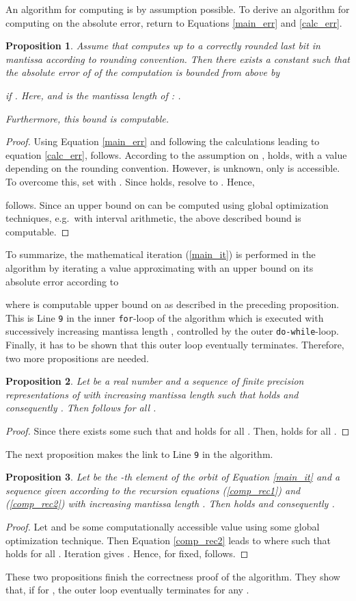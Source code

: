 \documentclass[copyright,creativecommons]{eptcs}
\newtheorem{proposition}{Proposition}[section]
\theoremstyle{definition}
\begin{document}
An algorithm for computing  is by assumption possible.
To derive an algorithm for computing  on the absolute
error, return to Equations \ref{main_err} and \ref{calc_err}.
\begin{proposition}
\label{prop:ubound}
Assume that  computes  up to
a correctly rounded last bit in mantissa according to rounding convention.
Then there exists a constant  such that the absolute error of
 of the computation  is bounded from above by

if . Here,
 and  is the mantissa length of : .

Furthermore, this bound is computable.
\end{proposition}
\begin{proof}
Using Equation \ref{main_err} and following the calculations leading to
equation \ref{calc_err},
 follows. According to the assumption
on ,
 holds, with
a value  depending on the rounding convention. However,
 is unknown, only  is accessible.
To overcome this, set 
with . Since  holds, resolve to
. Hence,

follows. Since an upper bound on  can be
computed using global optimization techniques, e.g.\ with interval
arithmetic, the above described bound is computable.
\end{proof}

To summarize, the mathematical iteration (\ref{main_it}) is performed
in the algorithm by iterating a value  approximating 
with an upper bound on its absolute error  according to

where  is computable
upper bound on  as described in the
preceding proposition.
This is Line {\tt 9} in the inner {\tt for}-loop of the algorithm
which is executed with successively increasing mantissa length ,
controlled by the outer {\tt do-while}-loop. Finally, it has to
be shown that this outer loop eventually terminates. Therefore,
two more propositions are needed.
\begin{proposition}
Let  be a real number and 
a sequence of finite precision representations of  with
increasing mantissa length  such that
 holds and consequently
. Then
 follows for
all .
\end{proposition}
\begin{proof}
Since  there
exists some  such that 
and  holds for all
. Then,  holds for all
.
\end{proof}
The next proposition makes the link to Line {\tt 9}
in the algorithm.
\begin{proposition}
\label{prop:alg_halt}
Let  be the -th element of the orbit of Equation
\ref{main_it} and  a sequence given
according to  the recursion equations (\ref{comp_rec1}) and
(\ref{comp_rec2}) with increasing mantissa length
. Then
 holds and consequently
.
\end{proposition}
\begin{proof}
Let   and  be some computationally
accessible value using some global optimization technique. Then
Equation \ref{comp_rec2} leads to 
 where
 such that
 holds for all .
Iteration gives
.
Hence, for  fixed,  follows.
\end{proof}
These two propositions finish the correctness proof of the
algorithm. They show that, if  for ,
the outer loop eventually terminates for any .
\end{document}
